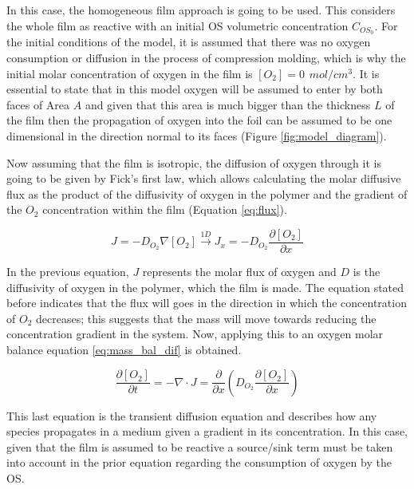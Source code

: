 \begin{refsection}
In this case, the homogeneous film approach is going to be used. This considers the whole film as reactive with an initial OS volumetric concentration $C_{OS_0}$. For the initial conditions of the model, it is assumed that there was no oxygen consumption or diffusion in the process of compression molding, which is why the initial molar concentration of oxygen in the film is $[O_2]=0 \hspace{5pt} mol/cm^3$.  It is essential to state that in this model oxygen will be assumed to enter by both faces of Area $A$ and given that this area is much bigger than the thickness $L$ of the film then the propagation of oxygen into the foil can be assumed to be one dimensional in the direction normal to its faces (Figure \ref{fig:model_diagram}).

Now assuming that the film is isotropic, the diffusion of oxygen through it is going to be given by Fick's first law, which allows calculating the molar diffusive flux as the product of the diffusivity of oxygen in the polymer and the gradient of the $O_2$ concentration within the film (Equation \ref{eq:flux}).


\begin{equation}
    J=-D_{O_2}\nabla [O_2] \xrightarrow{1D}J_x=-D_{O_2}\frac{\partial [O_2]}{\partial x}
    \label{eq:flux}
\end{equation}

In the previous equation, $J$ represents the molar flux of oxygen and $D$ is the diffusivity of oxygen in the polymer, which the film is made. The equation stated before indicates that the flux  will goes in the direction in which the concentration of $O_2$  decreases; this suggests that the mass will move towards reducing the concentration gradient in the system. Now, applying this to an oxygen molar balance equation \ref{eq:mass_bal_dif} is obtained. 

\begin{equation}
    \frac{\partial [O_2]}{\partial t}= -\nabla \cdot J= \frac{\partial}{\partial x} \left(D_{O_2}\frac{\partial [O_2] }{\partial x}\right)
    \label{eq:mass_bal_dif}
\end{equation}

This last equation is the transient diffusion equation and describes how any species propagates in a medium given a gradient in its concentration. In this case, given that the film is assumed to be reactive a source/sink term must be taken into account in the prior equation regarding the consumption of oxygen by the OS.


\end{refsection}
